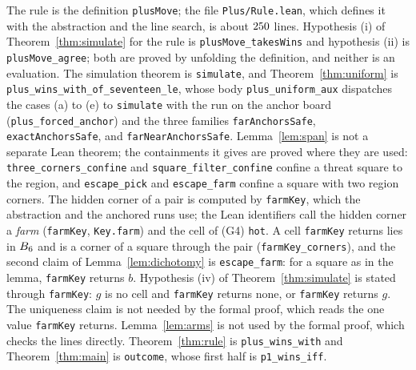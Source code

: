 \documentclass[11pt]{amsart}
\theoremstyle{definition}
\theoremstyle{remark}
\begin{document}
The rule is the definition \texttt{plusMove}; the file
\texttt{Plus/Rule.lean}, which defines it with the abstraction and the
line search, is about $250$ lines.
Hypothesis (i) of Theorem~\ref{thm:simulate} for the rule is
\texttt{plusMove\_takesWins} and hypothesis (ii) is
\texttt{plusMove\_agree}; both are proved by unfolding the definition,
and neither is an evaluation. The simulation theorem is \texttt{simulate}, and
Theorem~\ref{thm:uniform} is
\texttt{plus\_wins\_with\_of\_seventeen\_le}, whose body
\texttt{plus\_uniform\_aux} dispatches the cases (a) to (e) to
\texttt{simulate} with the run on the anchor board
(\texttt{plus\_forced\_anchor}) and the three families
\texttt{farAnchorsSafe}, \texttt{exactAnchorsSafe}, and
\texttt{farNearAnchorsSafe}. Lemma~\ref{lem:span} is not a separate
Lean theorem; the containments it gives are proved where they are
used: \texttt{three\_corners\_confine} and
\texttt{square\_filter\_confine} confine a threat square to the
region, and \texttt{escape\_pick} and \texttt{escape\_farm} confine a
square with two region corners. The hidden corner of a pair
is computed by \texttt{farmKey}, which the abstraction and the anchored
runs use; the Lean identifiers call the hidden corner a \emph{farm}
(\texttt{farmKey}, \texttt{Key.farm}) and the cell of (G4) \texttt{hot}.
A cell \texttt{farmKey} returns lies in $B_6$ and is a corner of a
square through the pair (\texttt{farmKey\_corners}), and the second
claim of Lemma~\ref{lem:dichotomy} is \texttt{escape\_farm}: for a
square as in the lemma, \texttt{farmKey} returns $b$. Hypothesis (iv)
of Theorem~\ref{thm:simulate} is stated through \texttt{farmKey}: $g$
is no cell and \texttt{farmKey} returns none, or \texttt{farmKey}
returns $g$. The uniqueness
claim is not needed by the formal proof, which reads the one value
\texttt{farmKey} returns. Lemma~\ref{lem:arms} is not used by the formal proof,
which checks the lines directly. Theorem~\ref{thm:rule} is
\texttt{plus\_wins\_with} and Theorem~\ref{thm:main} is
\texttt{outcome}, whose first half is \texttt{p1\_wins\_iff}.
\end{document}
